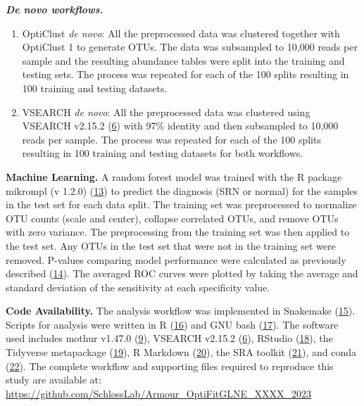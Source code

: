 \documentclass[
]{article}
\providecommand{\tightlist}{%
  \setlength{\itemsep}{0pt}\setlength{\parskip}{0pt}}
\begin{document}
\textbf{\emph{De novo workflows.}}

\begin{enumerate}
\def\labelenumi{\arabic{enumi}.}
\setcounter{enumi}{3}
\tightlist
\item
  OptiClust \emph{de novo}: All the preprocessed data was clustered
  together with OptiClust 1 to generate OTUs. The data was subsampled to
  10,000 reads per sample and the resulting abundance tables were split
  into the training and testing sets. The process was repeated for each
  of the 100 splits resulting in 100 training and testing datasets.
\item
  VSEARCH \emph{de novo}: All the preprocessed data was clustered using
  VSEARCH v2.15.2 (\protect\hyperlink{ref-rognes2016}{6}) with 97\%
  identity and then subsampled to 10,000 reads per sample. The process
  was repeated for each of the 100 splits resulting in 100 training and
  testing datasets for both workflows.
\end{enumerate}

\textbf{Machine Learning.} A random forest model was trained with the R
package mikrompl (v 1.2.0)
(\protect\hyperlink{ref-topuxe7uoglu2021}{13}) to predict the diagnosis
(SRN or normal) for the samples in the test set for each data split. The
training set was preprocessed to normalize OTU counts (scale and
center), collapse correlated OTUs, and remove OTUs with zero variance.
The preprocessing from the training set was then applied to the test
set. Any OTUs in the test set that were not in the training set were
removed. P-values comparing model performance were calculated as
previously described (\protect\hyperlink{ref-topuxe7uoglu2020}{14}). The
averaged ROC curves were plotted by taking the average and standard
deviation of the sensitivity at each specificity value.

\textbf{Code Availability.} The analysis workflow was implemented in
Snakemake (\protect\hyperlink{ref-koster2012}{15}). Scripts for analysis
were written in R (\protect\hyperlink{ref-R2020}{16}) and GNU bash
(\protect\hyperlink{ref-GNUbash}{17}). The software used includes mothur
v1.47.0 (\protect\hyperlink{ref-schloss2009}{9}), VSEARCH v2.15.2
(\protect\hyperlink{ref-rognes2016}{6}), RStudio
(\protect\hyperlink{ref-RStudio2019}{18}), the Tidyverse metapackage
(\protect\hyperlink{ref-wickham2019}{19}), R Markdown
(\protect\hyperlink{ref-xie_r_2018}{20}), the SRA toolkit
(\protect\hyperlink{ref-noauthor_sra-tools_nodate}{21}), and conda
(\protect\hyperlink{ref-noauthor_anaconda_2016}{22}). The complete
workflow and supporting files required to reproduce this study are
available at:
\url{https://github.com/SchlossLab/Armour_OptiFitGLNE_XXXX_2023}
\end{document}
